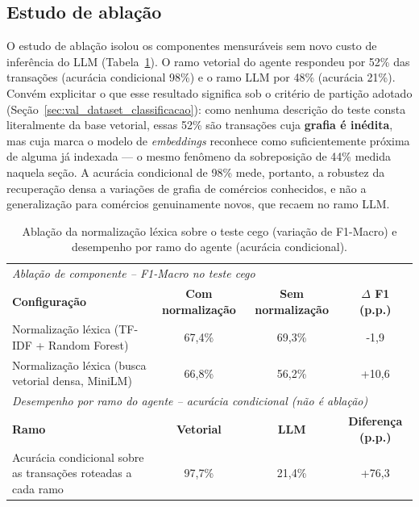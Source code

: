 \subsection{Estudo de ablação}
\label{sec:val_ablacao_discussao}
O estudo de ablação isolou os componentes mensuráveis sem novo custo de inferência do LLM
(Tabela~\ref{tab:ablacao}). O ramo vetorial do agente respondeu por 52\% das transações (acurácia condicional 98\%) e o ramo LLM por 48\% (acurácia 21\%). Convém explicitar o que esse resultado significa sob o critério de partição adotado (Seção~\ref{sec:val_dataset_classificacao}): como nenhuma descrição do teste consta literalmente da base vetorial, essas 52\% são transações cuja \textbf{grafia é inédita}, mas cuja marca o modelo de \textit{embeddings} reconhece como suficientemente próxima de alguma já indexada --- o mesmo fenômeno da sobreposição de 44\% medida naquela seção. A acurácia condicional de 98\% mede, portanto, a robustez da recuperação densa a variações de grafia de comércios conhecidos, e não a generalização para comércios genuinamente novos, que recaem no ramo LLM.

\begin{table}[htb]
	\centering
	\caption{Ablação da normalização léxica sobre o teste cego (variação de F1-Macro) e desempenho por ramo do agente (acurácia condicional).}
	\label{tab:ablacao}
	\begin{tabularx}{\textwidth}{X c c c}
		\toprule
		\multicolumn{4}{l}{\textit{Ablação de componente -- F1-Macro no teste cego}} \\
		\textbf{Configuração} & \textbf{Com normalização} & \textbf{Sem normalização} & \textbf{$\Delta$ F1 (p.p.)} \\
		\midrule
		Normalização léxica (TF-IDF + Random Forest) & 67,4\% & 69,3\% & -1,9 \\
		Normalização léxica (busca vetorial densa, MiniLM) & 66,8\% & 56,2\% & +10,6 \\
		\midrule
		\multicolumn{4}{l}{\textit{Desempenho por ramo do agente -- acurácia condicional (não é ablação)}} \\
		\textbf{Ramo} & \textbf{Vetorial} & \textbf{LLM} & \textbf{Diferença (p.p.)} \\
		\midrule
		Acurácia condicional sobre as transações roteadas a cada ramo & 97,7\% & 21,4\% & +76,3 \\
		\bottomrule
	\end{tabularx}
\end{table}


